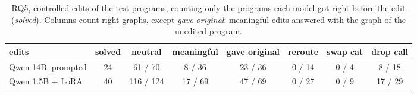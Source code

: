 \begin{table}[!h]
\centering
\small
\begin{tabular}{lccccccc}
\hline
edits & solved & neutral & meaningful & gave original & reroute & swap cat & drop call \\
\hline
Qwen 14B, prompted & 24 & 61 / 70 & 8 / 36 & 23 / 36 & 0 / 14 & 0 / 4 & 8 / 18 \\
Qwen 1.5B + LoRA & 40 & 116 / 124 & 17 / 69 & 47 / 69 & 0 / 27 & 0 / 9 & 17 / 29 \\
\hline
\end{tabular}
\caption{RQ5, controlled edits of the test programs, counting only the programs each model got right before the edit (\emph{solved}). Columns count right graphs, except \emph{gave original}: meaningful edits answered with the graph of the unedited program.}\label{tab:closing_rq5}
\end{table}
